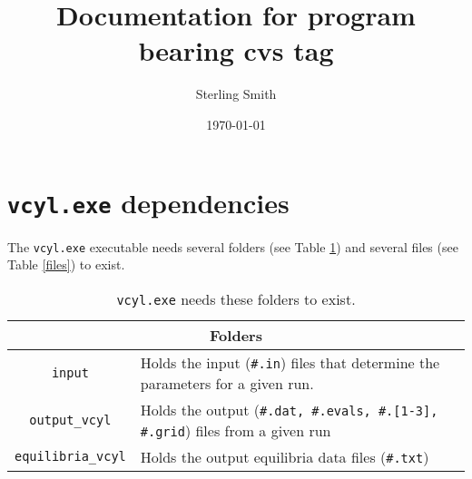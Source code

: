 \documentclass[letterpaper]{article}
\title{Documentation for program bearing cvs tag \ttt{fa\_x}}
\author{Sterling Smith}
\date{\today}
\newcommand{\ttt}[1]{\texttt{#1}}
\begin{document}
\maketitle
\section{\ttt{vcyl.exe} dependencies}
The \ttt{vcyl.exe} executable needs several folders (see Table \ref{folders}) and several files (see Table \ref{files}) to exist.
\begin{table}[h]
  \begin{tabular}{|c|p{3.3in}|}
    \hline
    \multicolumn{2}{|c|}{Folders} \\
    \hline
    \ttt{input} & Holds the input (\ttt{\#.in}) files that determine the parameters for a given run. \\
    \hline
    \ttt{output\_vcyl} & Holds the output (\ttt{\#.dat, \#.evals, \#.[1-3], \#.grid}) files from a given run \\
    \hline
    \ttt{equilibria\_vcyl} & Holds the output equilibria data files (\ttt{\#.txt}) \\
    \hline
  \end{tabular}
  \caption{\ttt{vcyl.exe} needs these folders to exist.\label{folders}}
\end{table}
\end{document}
